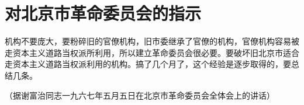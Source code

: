 \section[对北京市革命委员会的指示（一九六七年五月）]{对北京市革命委员会的指示}


机构不要庞大，要粉碎旧的官僚机构，旧市委继承了官僚的机构，官僚机构容易被走资本主义道路当权派所利用，所以建立革命委员会很必要。要破坏旧北京市适合走资本主义道路当权派利用的机构。搞了几个月了，这个经验是逐步取得的，要总结几条。

{\raggedleft （据谢富治同志一九六七年五月五日在北京市革命委员会全体会上的讲话）\par}


